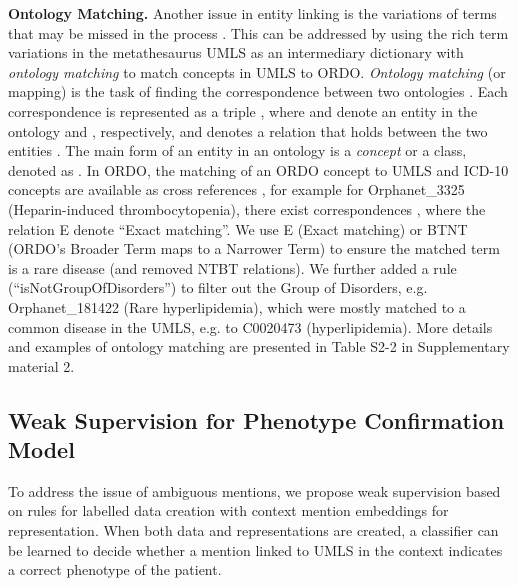 \documentclass[twocolumn]{bmcart}
\begin{document}
\textbf{Ontology Matching.} Another issue in entity linking is the variations of terms that may be missed in the process \cite{shen2015}. This can be addressed by using the rich term variations in the metathesaurus UMLS as an intermediary dictionary with \emph{ontology matching} to match concepts in UMLS to ORDO. \emph{Ontology matching} (or mapping) is the task of finding the correspondence between two ontologies \cite{noy_ontology_2009}. Each correspondence is represented as a triple , where  and  denote an entity in the ontology  and , respectively, and  denotes a relation that holds between the two entities \cite[p.~43]{euzenat_matching_2013}. The main form of an entity in an ontology is a \textit{concept} or a class, denoted as  \cite[p.~34]{euzenat_matching_2013}. In ORDO, the matching of an ORDO concept to UMLS and ICD-10 concepts are available as cross references \cite{vasant2014ordo}, for example for Orphanet\_3325 (Heparin-induced thrombocytopenia), there exist correspondences , where the relation E denote ``Exact matching''. We use E (Exact matching) or BTNT (ORDO's Broader Term maps to a Narrower Term) to ensure the matched term is a rare disease (and removed NTBT relations). We further added a rule (``isNotGroupOfDisorders'') to filter out the Group of Disorders, e.g. Orphanet\_181422 (Rare hyperlipidemia), which were mostly matched to a common disease in the UMLS, e.g. to C0020473 (hyperlipidemia). More details and examples of ontology matching are presented in Table S2-2 in Supplementary material 2.

\subsection*{Weak Supervision for Phenotype Confirmation Model}
To address the issue of ambiguous mentions, we propose weak supervision based on rules for labelled data creation with context mention embeddings for representation. When both data and representations are created, a classifier can be learned to decide whether a mention linked to UMLS in the context indicates a correct phenotype of the patient.
\end{document}
